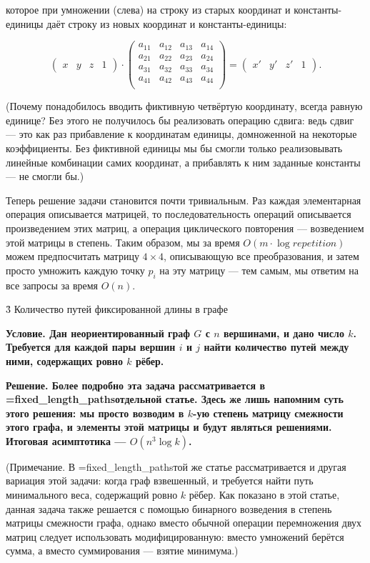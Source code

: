 которое при умножении (слева) на строку из старых координат и константы-единицы даёт строку из новых координат и константы-единицы:

$$ \begin{pmatrix} x & y & z & 1 \end{pmatrix} \cdot \begin{pmatrix}
a_{11} & a_{12} & a_{13} & a_{14} \\
a_{21} & a_{22} & a_{23} & a_{24} \\
a_{31} & a_{32} & a_{33} & a_{34} \\
a_{41} & a_{42} & a_{43} & a_{44} \\
\end{pmatrix} = \begin{pmatrix} x' & y' & z' & 1 \end{pmatrix}. $$

(Почему понадобилось вводить фиктивную четвёртую координату, всегда равную единице? Без этого не получилось бы реализовать операцию сдвига: ведь сдвиг --- это как раз прибавление к координатам единицы, домноженной на некоторые коэффициенты. Без фиктивной единицы мы бы смогли только реализовывать линейные комбинации самих координат, а прибавлять к ним заданные константы --- не смогли бы.)

Теперь решение задачи становится почти тривиальным. Раз каждая элементарная операция описывается матрицей, то последовательность операций описывается произведением этих матриц, а операция циклического повторения --- возведением этой матрицы в степень. Таким образом, мы за время $O (m \cdot \log repetition)$ можем предпосчитать матрицу $4 \times 4$, описывающую все преобразования, и затем просто умножить каждую точку $p_i$ на эту матрицу --- тем самым, мы ответим на все запросы за время $O (n)$.


\h3{ Количество путей фиксированной длины в графе }

\bf{Условие}. Дан неориентированный граф $G$ с $n$ вершинами, и дано число $k$. Требуется для каждой пары вершин $i$ и $j$ найти количество путей между ними, содержащих ровно $k$ рёбер.

\bf{Решение}. Более подробно эта задача рассматривается в \algohref=fixed_length_paths{отдельной статье}. Здесь же лишь напомним суть этого решения: мы просто возводим в $k$-ую степень матрицу смежности этого графа, и элементы этой матрицы и будут являться решениями. Итоговая асимптотика --- $O (n^3 \log k)$.

(Примечание. В \algohref=fixed_length_paths{той же статье} рассматривается и другая вариация этой задачи: когда граф взвешенный, и требуется найти путь минимального веса, содержащий ровно $k$ рёбер. Как показано в этой статье, данная задача также решается с помощью бинарного возведения в степень матрицы смежности графа, однако вместо обычной операции перемножения двух матриц следует использовать модифицированную: вместо умножений берётся сумма, а вместо суммирования --- взятие минимума.)


